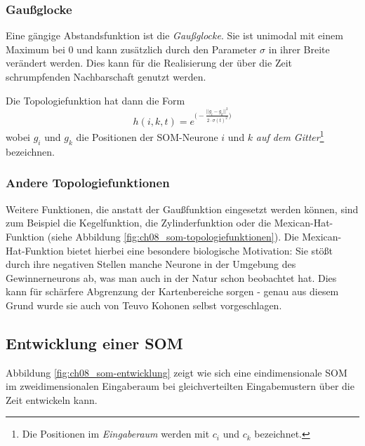 \subsubsection*{Gaußglocke}
Eine gängige Abstandsfunktion ist die \emph{Gaußglocke}. Sie ist unimodal mit einem Maximum bei 0 und kann zusätzlich durch den Parameter $\sigma$ in ihrer Breite verändert werden. Dies kann für die Realisierung der über die Zeit schrumpfenden Nachbarschaft genutzt werden.

Die Topologiefunktion hat dann die Form
\[
	h(i,k,t) = e^{\big(- \frac{||g_i - g_k||^2}{2 \cdot \sigma(t)^2}\big)}
\]
wobei $g_i$ und $g_k$ die Positionen der SOM-Neurone $i$ und $k$ \emph{auf dem Gitter}\footnote{Die Positionen im \emph{Eingaberaum} werden mit $c_i$ und $c_k$ bezeichnet.} bezeichnen.

\subsubsection*{Andere Topologiefunktionen}
Weitere Funktionen, die anstatt der Gaußfunktion eingesetzt werden können, sind zum Beispiel die Kegelfunktion, die Zylinderfunktion oder die Mexican-Hat-Funktion (siehe Abbildung \ref{fig:ch08_som-topologiefunktionen}).
Die Mexican-Hat-Funktion bietet hierbei eine besondere biologische Motivation: Sie stößt durch ihre negativen Stellen manche Neurone in der Umgebung des Gewinnerneurons ab, was man auch in der Natur schon beobachtet hat.
Dies kann für schärfere Abgrenzung der Kartenbereiche sorgen - genau aus diesem Grund wurde sie auch von Teuvo Kohonen selbst vorgeschlagen.


\subsection*{Entwicklung einer SOM}
Abbildung \ref{fig:ch08_som-entwicklung} zeigt wie sich eine eindimensionale SOM im zweidimensionalen Eingaberaum bei gleichverteilten Eingabemustern über die Zeit entwickeln kann.

